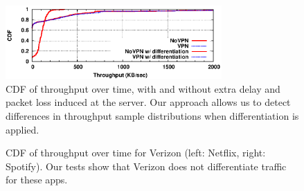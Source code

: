 \documentclass[letterpaper]{sig-alternate-2013}
\begin{document}



\begin{figure}[t!]
	\centering
	\includegraphics[width=3.25in]{figures/diff_no_diff.eps}
	\caption{CDF of throughput over time, with and without extra delay and packet loss induced at the server. 
	Our approach allows us to detect differences in throughput sample distributions when differentiation is applied. }
	\label{fig:diff}
\end{figure}


\begin{figure}[h]
\centering
\vspace{0.2in}
\caption{CDF of throughput over time for Verizon (left: Netflix, right: Spotify). Our tests show 
that Verizon does not differentiate traffic for these apps.}
\label{fig:nodiff}
\end{figure}
\end{document}
